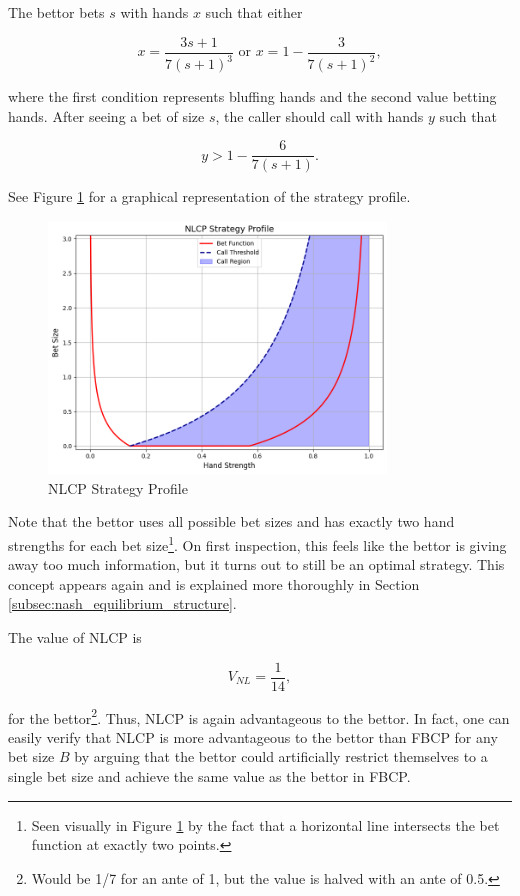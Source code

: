\documentclass[../../main/main.tex]{subfiles}
\begin{document}
The bettor bets $s$ with hands $x$ such that either

$$ x = \frac{3 s+1}{7 (s+1)^3} \text{ or } x = 1 - \frac{3}{7 (s+1)^2}, $$

where the first condition represents bluffing hands and the second value betting hands. After seeing a bet of size $s$, the caller should call with hands $y$ such that

$$ y > 1 - \frac{6}{7 (s+1)}. $$

See Figure \ref{fig:nlcp_strategy_profile} for a graphical representation of the strategy profile.

\begin{figure}[h!]
    \centering
    \includegraphics[width=0.8\textwidth]{images/NLCP_strategy_profile.png}
    \caption{NLCP Strategy Profile}
    \label{fig:nlcp_strategy_profile}
\end{figure}

Note that the bettor uses all possible bet sizes and has exactly two hand strengths for each bet size\footnote{Seen visually in Figure \ref{fig:nlcp_strategy_profile} by the fact that a horizontal line intersects the bet function at exactly two points.}. On first inspection, this feels like the bettor is giving away too much information, but it turns out to still be an optimal strategy. This concept appears again and is explained more thoroughly in Section \ref{subsec:nash_equilibrium_structure}.

The value of NLCP is

$$ V_{NL} = \frac{1}{14}, $$

for the bettor\footnote{Would be 1/7 for an ante of 1, but the value is halved with an ante of 0.5.}. Thus, NLCP is again advantageous to the bettor. In fact, one can easily verify that NLCP is more advantageous to the bettor than FBCP for any bet size $B$ by arguing that the bettor could artificially restrict themselves to a single bet size and achieve the same value as the bettor in FBCP.
\end{document}

